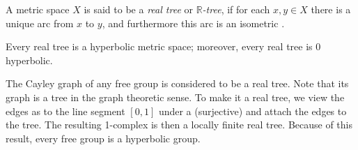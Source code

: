 \documentclass[12pt]{article}
\newcommand{\mbb}{\mathbb}
\begin{document}
A metric space $X$ is said to be a \emph{real tree} or
\emph{$\mbb{R}$-tree}, if for each $x,y\in X$ there is a unique arc
from $x$ to $y$, and furthermore this arc is an isometric .

Every real tree is a hyperbolic metric space; moreover, every real tree is 0 hyperbolic.

The Cayley graph of any free group is considered to be a real tree.  Note that its graph is a tree in the graph theoretic sense.  To make it a real tree, we view the edges as  to the line segment $[0,1]$ under a (surjective)  and attach the edges to the tree.  The resulting 1-complex is then a locally finite real tree.  Because of this result, every free group is a hyperbolic group.
\end{document}
